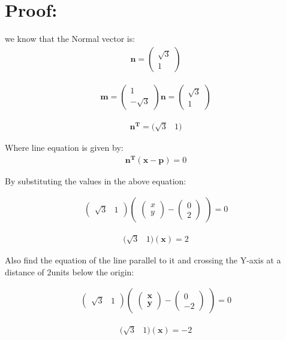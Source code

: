 \documentclass[journal,10pt,twocolumn]{article}
\let\vec\mathbf
\newcommand{\myvec}[1]{\ensuremath{\begin{pmatrix}#1\end{pmatrix}}}
\begin{document}
\section*{Proof:}
we know that the Normal vector is:
\begin{eqnarray}
	\vec{n}=\myvec{\sqrt{3}\\1}
\end{eqnarray}


\begin{eqnarray}
	\vec{m}=\myvec{1\\-\sqrt{3}}
	\vec{n}=\myvec{\sqrt{3}\\1}
\end{eqnarray}


\begin{eqnarray}
	\vec{n^T}=(\sqrt{3}&1)	
\end{eqnarray}






Where line equation  is given by:
\begin{align}
\vec{n^T(x-p)}=0
\label{pf2-eq-1}
\end{align}

By substituting the values in the above equation:



\begin{eqnarray}
	\myvec{\sqrt{3} &1}\myvec{\myvec{x\\y}-\myvec{0\\2}}=0
\end{eqnarray}




\begin{eqnarray}
	(\sqrt{3}&1)
\vec{(x)}=2
\end{eqnarray}








Also find the equation of the line parallel to it and crossing the Y-axis at a distance of 2units below the origin:





\begin{eqnarray}
	\myvec{\sqrt{3} &1}\myvec{\myvec{\vec{x}\\\vec{y}}-\myvec{0\\-2}}=0
\end{eqnarray}






\begin{eqnarray}
	(\sqrt{3}&1)
\vec{(x)}=-2
\end{eqnarray}
\end{document}
